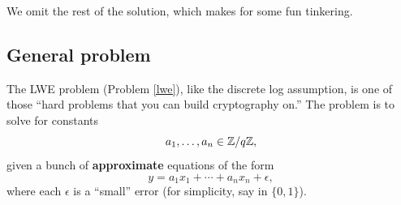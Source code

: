 We omit the rest of the solution, which makes for some fun tinkering.

\subsection{General problem}

The LWE problem (Problem \ref{lwe}), like the discrete log
assumption, is one of those ``hard problems that you can build cryptography on.''
The problem is to solve for constants
\[a_{1},\ldots,a_{n} \in \mathbb{Z}/q\mathbb{Z},\] given a bunch of
\textbf{approximate} equations of the form
\[y = a_{1}x_{1} + \cdots + a_{n}x_{n} + \epsilon,\] where each
$\epsilon$ is a ``small'' error (for simplicity, say in $\{ 0,1\}$).
